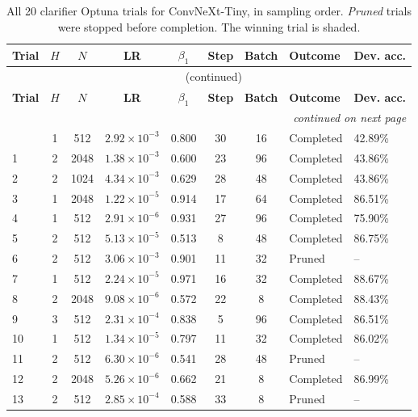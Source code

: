 {\footnotesize
\begin{longtable}{lccccccll}
\caption{All 20 clarifier Optuna trials for ConvNeXt-Tiny, in sampling order. \emph{Pruned} trials were stopped before completion. The winning trial is shaded.}
\label{tab:trials_convnext} \\
\toprule
\textbf{Trial} & \textbf{$H$} & \textbf{$N$} & \textbf{LR} & \textbf{$\beta_1$} & \textbf{Step} & \textbf{Batch} & \textbf{Outcome} & \textbf{Dev. acc.} \\
\midrule
\endfirsthead
\multicolumn{9}{c}{\tablename\ \thetable{} (continued)} \\
\toprule
\textbf{Trial} & \textbf{$H$} & \textbf{$N$} & \textbf{LR} & \textbf{$\beta_1$} & \textbf{Step} & \textbf{Batch} & \textbf{Outcome} & \textbf{Dev. acc.} \\
\midrule
\endhead
\midrule
\multicolumn{9}{r}{\emph{continued on next page}} \\
\endfoot
\bottomrule
\endlastfoot
0 & 1 & 512 & $2.92\times10^{-3}$ & 0.800 & 30 & 16 & Completed & 42.89\% \\
1 & 2 & 2048 & $1.38\times10^{-3}$ & 0.600 & 23 & 96 & Completed & 43.86\% \\
2 & 2 & 1024 & $4.34\times10^{-3}$ & 0.629 & 28 & 48 & Completed & 43.86\% \\
3 & 1 & 2048 & $1.22\times10^{-5}$ & 0.914 & 17 & 64 & Completed & 86.51\% \\
4 & 1 & 512 & $2.91\times10^{-6}$ & 0.931 & 27 & 96 & Completed & 75.90\% \\
5 & 2 & 512 & $5.13\times10^{-5}$ & 0.513 & 8 & 48 & Completed & 86.75\% \\
6 & 2 & 512 & $3.06\times10^{-3}$ & 0.901 & 11 & 32 & Pruned & -- \\
7 & 1 & 512 & $2.24\times10^{-5}$ & 0.971 & 16 & 32 & Completed & 88.67\% \\
8 & 2 & 2048 & $9.08\times10^{-6}$ & 0.572 & 22 & 8 & Completed & 88.43\% \\
9 & 3 & 512 & $2.31\times10^{-4}$ & 0.838 & 5 & 96 & Completed & 86.51\% \\
10 & 1 & 512 & $1.34\times10^{-5}$ & 0.797 & 11 & 32 & Completed & 86.02\% \\
11 & 2 & 512 & $6.30\times10^{-6}$ & 0.541 & 28 & 48 & Pruned & -- \\
12 & 2 & 2048 & $5.26\times10^{-6}$ & 0.662 & 21 & 8 & Completed & 86.99\% \\
13 & 2 & 512 & $2.85\times10^{-4}$ & 0.588 & 33 & 8 & Pruned & -- \\

\end{longtable}}
